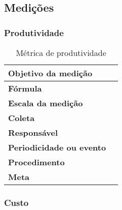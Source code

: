 \subsection{Medições}

\subsubsection{Produtividade}

\begin{table}[H]
\centering
\begin{tabular}{|p{4cm}|p{5cm}|}
\hline
	\textbf{Objetivo da medição} &

	\\ \hline
	\textbf{Fórmula} &

	\\ \hline
	\textbf{Escala da medição} &

	\\ \hline
	\textbf{Coleta} &

	\\ \hline
	\textbf{Responsável} &

	\\ \hline
	\textbf{Periodicidade ou evento} &

	\\ \hline
	\textbf{Procedimento} &

	\\ \hline
  \textbf{Meta} &

  \\ \hline
\end{tabular}
\caption{Métrica de produtividade}
\label{tab:métrica_de_produtividade}
\end{table}


\subsubsection{Custo}

